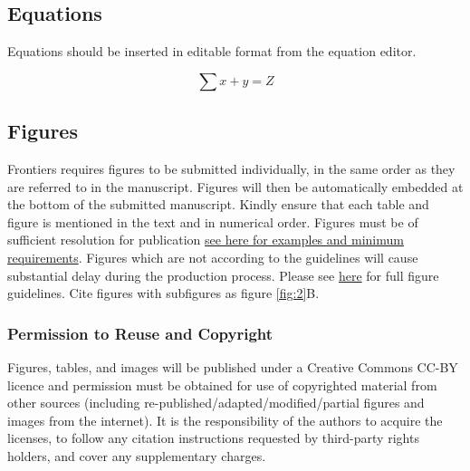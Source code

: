 \documentclass[utf8]{frontiersSCNS} %
\begin{document}
\subsection{Equations}
Equations should be inserted in editable format from the equation editor.

\begin{equation}
\sum x+ y =Z\label{eq:01}
\end{equation}

\subsection{Figures}
Frontiers requires figures to be submitted individually, in the same order as they are referred to in the manuscript. Figures will then be automatically embedded at the bottom of the submitted manuscript. Kindly ensure that each table and figure is mentioned in the text and in numerical order. Figures must be of sufficient resolution for publication \href{http://home.frontiersin.org/about/author-guidelines#ResolutionRequirements}{see here for examples and minimum requirements}. Figures which are not according to the guidelines will cause substantial delay during the production process. Please see \href{http://home.frontiersin.org/about/author-guidelines#GeneralStyleGuidelinesforFigures}{here} for full figure guidelines. Cite figures with subfigures as figure \ref{fig:2}B.


\subsubsection{Permission to Reuse and Copyright}
Figures, tables, and images will be published under a Creative Commons CC-BY licence and permission must be obtained for use of copyrighted material from other sources (including re-published/adapted/modified/partial figures and images from the internet). It is the responsibility of the authors to acquire the licenses, to follow any citation instructions requested by third-party rights holders, and cover any supplementary charges.
\end{document}
